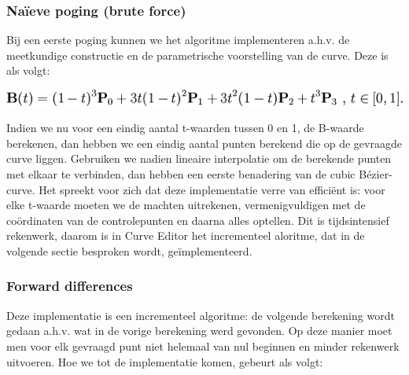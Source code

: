 \documentclass[a4paper,11pt,oneside, titlepage]{article}
\begin{document}
\subsubsection{Na\"ieve poging (brute force)}
Bij een eerste poging kunnen we het algoritme implementeren a.h.v. de meetkundige constructie en de parametrische voorstelling van de curve.
Deze is als volgt:\newline
\begin{center}
\includegraphics[scale=0.5]{bezier.png}
\end{center}
Indien we nu voor een eindig aantal t-waarden tussen 0 en 1, de B-waarde berekenen, dan hebben we een eindig aantal punten berekend die op de gevraagde curve
liggen. Gebruiken we nadien lineaire interpolatie om de berekende punten met elkaar te verbinden, dan hebben een eerste benadering van de cubic B\'ezier-curve.
Het spreekt voor zich dat deze implementatie verre van effici\"ent is: voor elke t-waarde moeten we de machten uitrekenen, vermenigvuldigen met de co\"ordinaten van de controlepunten
en daarna alles optellen. Dit is tijdsintensief rekenwerk, daarom is in Curve Editor het incrementeel aloritme, dat in de volgende sectie besproken wordt, ge\"implementeerd.
\subsubsection{Forward differences}
Deze implementatie is een incrementeel algoritme: de volgende berekening wordt gedaan a.h.v. wat in de vorige berekening werd gevonden. Op deze manier moet men voor elk gevraagd punt niet
helemaal van nul beginnen en minder rekenwerk uitvoeren. Hoe we tot de implementatie komen, gebeurt als volgt:
\end{document}
